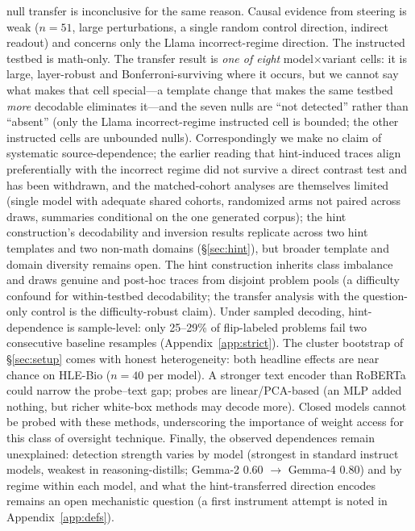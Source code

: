\documentclass[11pt]{article}
\begin{document}
null transfer is inconclusive for the same reason. Causal evidence from steering is weak ($n{=}51$, large perturbations, a single random control direction, indirect readout) and concerns only the Llama incorrect-regime direction. The instructed testbed is math-only. The transfer result is \emph{one of eight} model$\times$variant cells: it is large, layer-robust and Bonferroni-surviving where it occurs, but we cannot say what makes that cell special---a template change that makes the same testbed \emph{more} decodable eliminates it---and the seven nulls are ``not detected'' rather than ``absent'' (only the Llama incorrect-regime instructed cell is bounded; the other instructed cells are unbounded nulls). Correspondingly we make no claim of systematic source-dependence; the earlier reading that hint-induced traces align preferentially with the incorrect regime did not survive a direct contrast test and has been withdrawn, and the matched-cohort analyses are themselves limited (single model with adequate shared cohorts, randomized arms not paired across draws, summaries conditional on the one generated corpus); the hint construction's decodability and inversion results replicate across two hint templates and two non-math domains (\S\ref{sec:hint}), but broader template and domain diversity remains open. The hint construction inherits class imbalance and draws genuine and post-hoc traces from disjoint problem pools (a difficulty confound for within-testbed decodability; the transfer analysis with the question-only control is the difficulty-robust claim). Under sampled decoding, hint-dependence is sample-level: only 25--29\% of flip-labeled problems fail two consecutive baseline resamples (Appendix~\ref{app:strict}). The cluster bootstrap of \S\ref{sec:setup} comes with honest heterogeneity: both headline effects are near chance on HLE-Bio ($n{=}40$ per model). A stronger text encoder than RoBERTa could narrow the probe--text gap; probes are linear/PCA-based (an MLP added nothing, but richer white-box methods may decode more). Closed models cannot be probed with these methods, underscoring the importance of weight access for this class of oversight technique. Finally, the observed dependences remain unexplained: detection strength varies by model (strongest in standard instruct models, weakest in reasoning-distills; Gemma-2 0.60 $\to$ Gemma-4 0.80) and by regime within each model, and what the hint-transferred direction encodes remains an open mechanistic question (a first instrument attempt is noted in Appendix~\ref{app:defs}).
\end{document}
